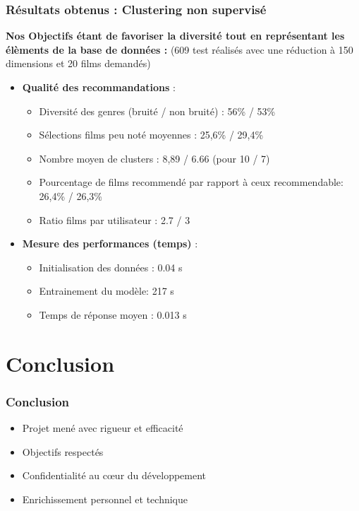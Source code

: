 \documentclass{beamer}
\begin{document}
\begin{frame}
    \frametitle{Résultats obtenus : Clustering non supervisé}
    \scriptsize
    \textbf{Nos Objectifs étant de favoriser la diversité tout en représentant les élèments de la base de données  :}
    (609 test réalisés avec une réduction à 150 dimensions et 20 films demandés)
    \vspace{0.3cm}
    \begin{itemize}
        \item \textbf{Qualité des recommandations} :

              \begin{itemize}
                  \item Diversité des genres (bruité / non bruité) : 56\% / 53\%
                  \item Sélections films peu noté moyennes : 25,6\% / 29,4\%
                  \item Nombre moyen de clusters : 8,89 / 6.66 (pour 10 / 7)
                  \item Pourcentage de films recommendé par rapport à ceux recommendable: 26,4\% / 26,3\%
                  \item Ratio films par utilisateur  :  2.7 / 3
              \end{itemize}
        \item \textbf{Mesure des performances (temps)} :
              \begin{itemize}
                  \item Initialisation des données :  0.04 s
                  \item Entrainement du modèle: 217 s
                  \item Temps de réponse moyen : 0.013 s
              \end{itemize}
    \end{itemize}
\end{frame}



\section{Conclusion}
\begin{frame}
    \frametitle{Conclusion}
    \begin{itemize}
        \item Projet mené avec rigueur et efficacité
        \item Objectifs respectés
        \item Confidentialité au cœur du développement
        \item Enrichissement personnel et technique
    \end{itemize}
\end{frame}
\end{document}

